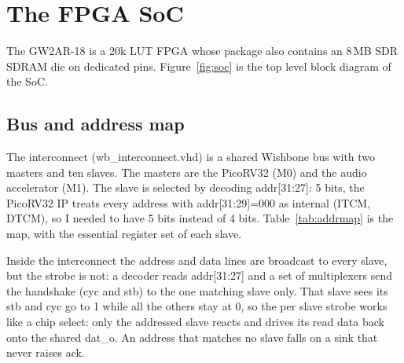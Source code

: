 \documentclass[a4paper,10pt]{article}
\begin{document}
\section{The FPGA SoC}
\label{sec:soc}

The GW2AR-18 is a 20k LUT FPGA whose package also contains an 8\,MB SDR SDRAM die on
dedicated pins. Figure~\ref{fig:soc} is the top level block diagram of the SoC.

\subsection{Bus and address map}

The interconnect (wb\_interconnect.vhd) is a shared Wishbone bus with two
masters and ten slaves. The masters are the PicoRV32 (M0) and the audio accelerator
(M1). The slave is selected by decoding addr[31:27]: 5 bits,
 the PicoRV32 IP treats every address with addr[31:29]=000 as internal
(ITCM, DTCM), so I needed to have 5 bits instead of 4 bits. \newline
Table~\ref{tab:addrmap} is the map, with the essential register set of
each slave.

Inside the interconnect the address and data lines are broadcast to every slave, but the
strobe is not: a decoder reads addr[31:27] and a set of multiplexers send the
handshake (cyc and stb) to the one matching slave only. That slave sees
its stb and cyc go to 1 while all the others stay at 0, so the per slave
strobe works like a chip select: only the addressed slave reacts and drives its read data
back onto the shared dat\_o. An address that matches no slave falls on a sink that
never raises ack.
\end{document}
